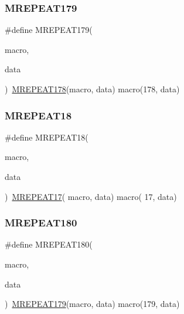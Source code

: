 \mbox{\label{group__group__sam0__utils__mrepeat_ga81eff2faaafc0dc30fa1c29f7c6e33f5}} 
\subsubsection{\texorpdfstring{MREPEAT179}{MREPEAT179}}
{\footnotesize\ttfamily \#define M\+R\+E\+P\+E\+A\+T179(\begin{DoxyParamCaption}\item[{}]{macro,  }\item[{}]{data }\end{DoxyParamCaption})~\mbox{\hyperlink{group__group__sam0__utils__mrepeat_gaba5fc88c5803e8272ce412fea9e908a3}{M\+R\+E\+P\+E\+A\+T178}}(macro, data)   macro(178, data)}

\mbox{\label{group__group__sam0__utils__mrepeat_gaeac781e6017f799e59bfc8d46e5cc9a1}} 
\subsubsection{\texorpdfstring{MREPEAT18}{MREPEAT18}}
{\footnotesize\ttfamily \#define M\+R\+E\+P\+E\+A\+T18(\begin{DoxyParamCaption}\item[{}]{macro,  }\item[{}]{data }\end{DoxyParamCaption})~\mbox{\hyperlink{group__group__sam0__utils__mrepeat_gaff45aee56d734a3bdf90cdd86b5693d9}{M\+R\+E\+P\+E\+A\+T17}}( macro, data)   macro( 17, data)}

\mbox{\label{group__group__sam0__utils__mrepeat_ga131a0e131d380f253f0748364eb9cc3f}} 
\subsubsection{\texorpdfstring{MREPEAT180}{MREPEAT180}}
{\footnotesize\ttfamily \#define M\+R\+E\+P\+E\+A\+T180(\begin{DoxyParamCaption}\item[{}]{macro,  }\item[{}]{data }\end{DoxyParamCaption})~\mbox{\hyperlink{group__group__sam0__utils__mrepeat_ga81eff2faaafc0dc30fa1c29f7c6e33f5}{M\+R\+E\+P\+E\+A\+T179}}(macro, data)   macro(179, data)}

